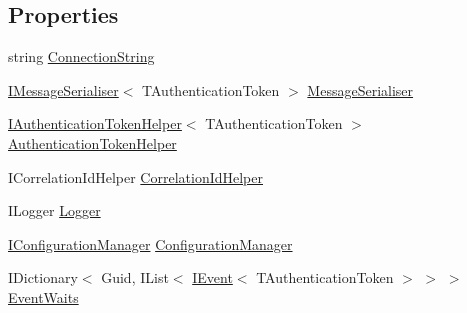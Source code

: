 \subsection*{Properties}
\begin{DoxyCompactItemize}
\item 
string \hyperlink{classCqrs_1_1Azure_1_1ServiceBus_1_1AzureBus_aaccdbc8cd25d3ae4f1a2801d2ad02a96_aaccdbc8cd25d3ae4f1a2801d2ad02a96}{Connection\+String}
\item 
\hyperlink{interfaceCqrs_1_1Azure_1_1ServiceBus_1_1IMessageSerialiser}{I\+Message\+Serialiser}$<$ T\+Authentication\+Token $>$ \hyperlink{classCqrs_1_1Azure_1_1ServiceBus_1_1AzureBus_ab6f7a7530a01f23ddec8029fe832392d_ab6f7a7530a01f23ddec8029fe832392d}{Message\+Serialiser}
\item 
\hyperlink{interfaceCqrs_1_1Authentication_1_1IAuthenticationTokenHelper}{I\+Authentication\+Token\+Helper}$<$ T\+Authentication\+Token $>$ \hyperlink{classCqrs_1_1Azure_1_1ServiceBus_1_1AzureBus_a5250b75a5ef26d52a96da74777958519_a5250b75a5ef26d52a96da74777958519}{Authentication\+Token\+Helper}
\item 
I\+Correlation\+Id\+Helper \hyperlink{classCqrs_1_1Azure_1_1ServiceBus_1_1AzureBus_aade10189c32052d50e067be90cb4fe1c_aade10189c32052d50e067be90cb4fe1c}{Correlation\+Id\+Helper}
\item 
I\+Logger \hyperlink{classCqrs_1_1Azure_1_1ServiceBus_1_1AzureBus_ad9bfb86c6f7724ce0729d45ddad4fbf5_ad9bfb86c6f7724ce0729d45ddad4fbf5}{Logger}
\item 
\hyperlink{interfaceCqrs_1_1Configuration_1_1IConfigurationManager}{I\+Configuration\+Manager} \hyperlink{classCqrs_1_1Azure_1_1ServiceBus_1_1AzureBus_aaf9469d220fb23cb0521fa76b25ab228_aaf9469d220fb23cb0521fa76b25ab228}{Configuration\+Manager}
\item 
I\+Dictionary$<$ Guid, I\+List$<$ \hyperlink{interfaceCqrs_1_1Events_1_1IEvent}{I\+Event}$<$ T\+Authentication\+Token $>$ $>$ $>$ \hyperlink{classCqrs_1_1Azure_1_1ServiceBus_1_1AzureBus_ae3c0fd5566add5441bb70b48eceb98be_ae3c0fd5566add5441bb70b48eceb98be}{Event\+Waits}

\end{DoxyCompactItemize}
